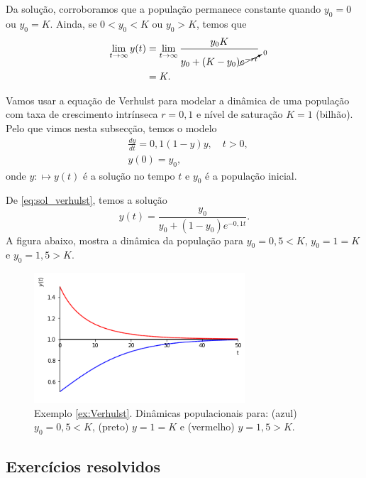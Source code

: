 Da solução, corroboramos que a população permanece constante quando $y_0 = 0$ ou $y_0 = K$. Ainda, se $0<y_0<K$ ou $y_0 > K$, temos que
\begin{align}
  \lim_{t\to\infty} y(t) &= \lim_{t\to\infty} \frac{y_0K}{y_0 + (K-y_0)\cancelto{0}{e^{-rt}}} \\
  &= K.
\end{align}

\begin{ex}\label{ex:Verhulst}
  Vamos usar a equação de Verhulst para modelar a dinâmica de uma população com taxa de crescimento intrínseca $r=0,1$ e nível de saturação $K=1$ (bilhão). Pelo que vimos nesta subsecção, temos o modelo
  \begin{align}
    &\frac{dy}{dt} = 0,1\left(1 - y\right)y,\quad t>0,\\
    &y(0) = y_0,
  \end{align}
  onde $y:\mapsto y(t)$ é a solução no tempo $t$ e $y_0$ é a população inicial.

  De \ref{eq:sol_verhulst}, temos a solução
  \begin{equation}
    y(t) = \frac{y_0}{y_0 + (1-y_0)e^{-0,1t}}.
  \end{equation}
  A figura abaixo, mostra a dinâmica da população para $y_0=0,5<K$, $y_0=1=K$ e $y_0=1,5>K$.

  \begin{figure}[H]
    \centering
    \includegraphics[width=0.7\textwidth]{cap_edo1ordem/dados/fig_ex_Verhulst/fig_ex_Verhulst}
    \caption{Exemplo \ref{ex:Verhulst}. Dinâmicas populacionais para: (azul) $y_0=0,5<K$, (preto) $y=1=K$ e (vermelho) $y=1,5>K$.}
    \label{fig:ex_Verhulst}
  \end{figure}
\end{ex}

\subsection*{Exercícios resolvidos}

